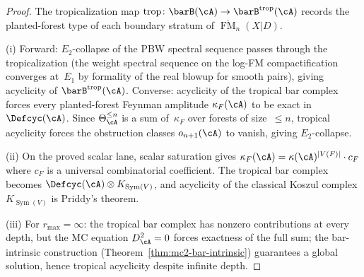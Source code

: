 \begin{proof}
The tropicalization map
$\mathrm{trop}\colon \barB(\cA)
\to \barB^{\mathrm{trop}}(\cA)$
records the planted-forest type of each boundary stratum
of $\overline{\operatorname{FM}}_n(X|D)$.

\smallskip\noindent
\textup{(i)} Forward: $E_2$-collapse of the PBW spectral sequence
passes through the tropicalization (the weight spectral sequence
on the log-FM compactification converges at~$E_1$ by formality
of the real blowup for smooth pairs), giving acyclicity of
$\barB^{\mathrm{trop}}(\cA)$.
Converse: acyclicity of the tropical bar complex forces every
planted-forest Feynman amplitude $\kappa_F(\cA)$ to be exact
in $\Defcyc(\cA)$.  Since $\Theta_\cA^{\leq n}$ is a sum
of~$\kappa_F$ over forests of size~$\leq n$, tropical acyclicity
forces the obstruction classes $o_{n+1}(\cA)$ to vanish, giving
$E_2$-collapse.

\smallskip\noindent
\textup{(ii)} On the proved scalar lane, scalar saturation gives
$\kappa_F(\cA) = \kappa(\cA)^{|V(F)|} \cdot c_F$
where $c_F$ is a universal combinatorial coefficient.
The tropical bar complex becomes $\Defcyc(\cA) \otimes
K_{\operatorname{Sym}(V)}$, and acyclicity of the classical Koszul
complex $K_{\operatorname{Sym}(V)}$ is Priddy's theorem.

\smallskip\noindent
\textup{(iii)} For $r_{\max} = \infty$: the tropical bar complex
has nonzero contributions at every depth, but the MC equation
$D_\cA^2 = 0$ forces exactness of the full sum; the
bar-intrinsic construction
(Theorem~\ref{thm:mc2-bar-intrinsic}) guarantees a global
solution, hence tropical acyclicity despite infinite depth.
\end{proof}

